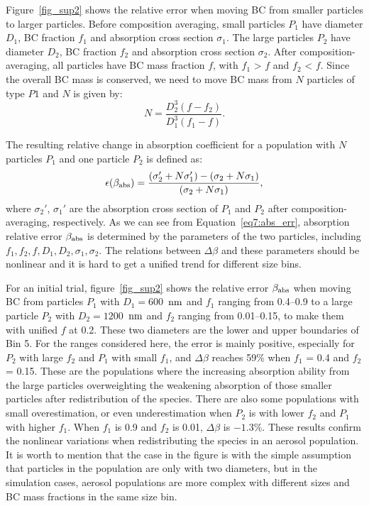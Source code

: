 \documentclass[edeposit,fullpage]{uiucthesis2009}
\makeatletter
\DeclareRobustCommand*\unit[1]
 {\ensuremath{%
   {\thinmuskip3mu\relax
    \def\mu{\text{\textmu}}\def~{\,}%
    \ifx\f@series\testbx\mathbf{#1}\else\mathrm{#1}\fi}}}
\makeatother
\begin{document}
Figure~\ref{fig_sup2} shows the relative error when moving BC
from smaller particles to larger particles. Before composition
averaging, small particles $P_1$ have diameter $D_1$, BC fraction
$f_1$ and absorption cross section $\sigma_1$. The large particles
$P_2$ have diameter $D_2$, BC fraction $f_2$ and absorption cross
section $\sigma_2$. After composition-averaging, all particles have BC
mass fraction $f$, with $f_1$ > $f$ and $f_2$ < $f$. Since the overall
BC mass is conserved, we need to move BC mass from $N$ particles of
type $P1$ and $N$ is given by:
\begin{equation}
N = \frac{D_2^3(f-f_2)}{D_1^3(f_1-f)}.
\end{equation}

The resulting relative change in absorption coefficient for a
population with $N$ particles $P_1$ and one particle $P_2$ is defined
as:
  \begin{equation}{\label{eq7:abs_err}}
   \epsilon(\beta_{\rm abs}) = \frac{(\sigma_2' + N\sigma_1') - (\sigma_2 + N\sigma_1)}{(\sigma_2 + N\sigma_1)},
  \end{equation}
  where $\sigma_2'$, $\sigma_1'$ are the absorption cross section of
  $P_1$ and $P_2$ after composition-averaging, respectively.  As we
  can see from Equation~\ref{eq7:abs_err}, absorption relative error
  $\beta_{\rm abs}$ is determined by the parameters of the two
  particles, including $f_1, f_2, f, D_1, D_2,\sigma_1, \sigma_2$. The
  relations between $\Delta \beta$ and these parameters should be
  nonlinear and it is hard to get a unified trend for different size
  bins.
  
  For an initial trial, figure~\ref{fig_sup2} shows the relative
  error $\beta_{\rm abs}$ when moving BC from particles $P_1$ with
  $D_1 = 600$~\unit{nm} and $f_1$ ranging from 0.4--0.9 to a large
  particle $P_2$ with $D_2 = 1200$~\unit{nm} and $f_2$ ranging from
  0.01--0.15, to make them with unified $f$ at 0.2.  These two
  diameters are the lower and upper boundaries of Bin 5. For the
  ranges considered here, the error is mainly positive, especially for
  $P_2$ with large $f_2$ and $P_1$ with small $f_1$, and $\Delta
  \beta$ reaches 59\% when $f_1$ = 0.4 and $f_2$ = 0.15. These are the
  populations where the increasing absorption ability from the large
  particles overweighting the weakening absorption of those smaller
  particles after redistribution of the species. There are also some
  populations with small overestimation, or even underestimation when
  $P_2$ is with lower $f_2$ and $P_1$ with higher $f_1$. When $f_1$ is
  0.9 and $f_2$ is 0.01, $\Delta \beta$ is $-1.3$\%. These results
  confirm the nonlinear variations when redistributing the species in
  an aerosol population. It is worth to mention that the case in the
  figure is with the simple assumption that particles in the
  population are only with two diameters, but in the simulation cases,
  aerosol populations are more complex with different sizes and BC
  mass fractions in the same size bin.
  
\end{document}
